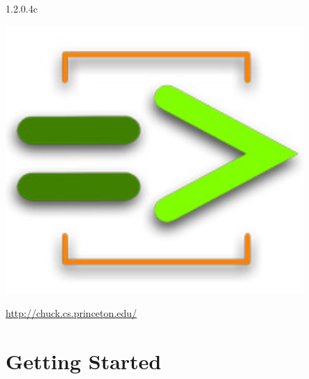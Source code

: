 \documentclass[11pt]{report}
\begin{document}
\thispagestyle{coverplain}
\vskip 6in
{\huge


}

\begin{center}
 1.2.0.4c
\end{center}
\vskip 1.5in
\begin{center}
  \includegraphics[height=4in]{images/chuck_logo2.jpg}

  \vskip 1in

  \Large{\href{http://chuck.cs.princeton.edu/}{http://chuck.cs.princeton.edu/}}
\end{center}

\newpage







\tableofcontents
\clearpage

\pagestyle{fancy}

\part*{Getting Started}
\end{document}
